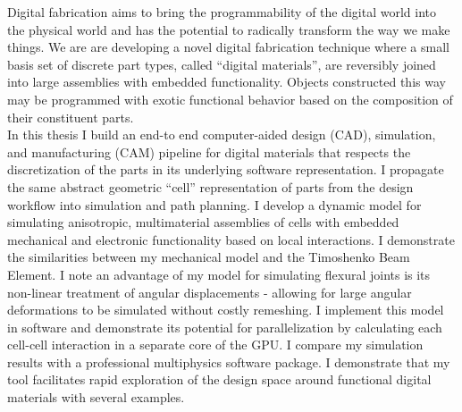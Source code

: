 % 
% 
%

Digital fabrication aims to bring the programmability of the digital world into the physical world and has the potential to radically transform the way we make things.  We are are developing a novel digital fabrication technique where a small basis set of discrete part types, called ``digital materials'', are reversibly joined into large assemblies with embedded functionality.  Objects constructed this way may be programmed with exotic functional behavior based on the composition of their constituent parts.\\

In this thesis I build an end-to end computer-aided design (CAD), simulation, and manufacturing (CAM) pipeline for digital materials that respects the discretization of the parts in its underlying software representation.  I propagate the same abstract geometric ``cell'' representation of parts from the design workflow into simulation and path planning.  I develop a dynamic model for simulating anisotropic, multimaterial assemblies of cells with embedded mechanical and electronic functionality based on local interactions.  I demonstrate the similarities between my mechanical model and the Timoshenko Beam Element.  I note an advantage of my model for simulating flexural joints is its non-linear treatment of angular displacements - allowing for large angular deformations to be simulated without costly remeshing.  I implement this model in software and demonstrate its potential for parallelization by calculating each cell-cell interaction in a separate core of the GPU.  I compare my simulation results with a professional multiphysics software package.  I demonstrate that my tool facilitates rapid exploration of the design space around functional digital materials with several examples.
